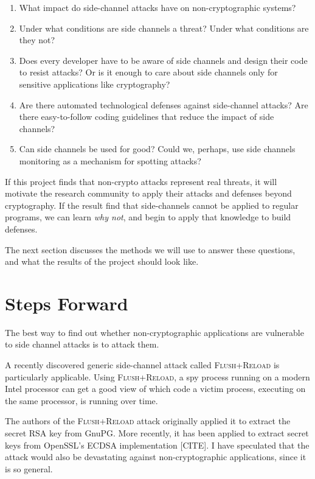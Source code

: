 \documentclass{acm_proc_article-sp}
\begin{document}
\begin{enumerate}
\item What impact do side-channel attacks have on non-cryptographic systems?

\item Under what conditions are side channels a threat? Under what conditions
      are they not?

\item Does every developer have to be aware of side channels and design their
      code to resist attacks? Or is it enough to care about side channels only
      for sensitive applications like cryptography?

\item Are there automated technological defenses against side-channel attacks?
      Are there easy-to-follow coding guidelines that reduce the impact of side
      channels?

\item Can side channels be used for good? Could we, perhaps, use side channels
      monitoring as a mechanism for spotting attacks?
\end{enumerate}

If this project finds that non-crypto attacks represent real threats, it will
motivate the research community to apply their attacks and defenses beyond
cryptography. If the result find that side-channels cannot be applied to regular
programs, we can learn \emph{why not}, and begin to apply that knowledge to
build defenses.

The next section discusses the methods we will use to answer these questions,
and what the results of the project should look like.

\section{Steps Forward}

The best way to find out whether non-cryptographic applications are vulnerable
to side channel attacks is to attack them.

A recently discovered generic side-channel attack called \textsc{Flush+Reload}
\cite{yarom2013flush} is particularly applicable. Using \textsc{Flush+Reload},
a spy process running on a modern Intel processor can get a good view of which
code a victim process, executing on the same processor, is running over time.

The authors of the \textsc{Flush+Reload} attack originally applied it to extract
the secret RSA key from GnuPG. More recently, it has been applied to extract
secret keys from OpenSSL's ECDSA implementation [CITE]. I have speculated
\cite{hornby2013flush} that the attack would also be devastating against
non-cryptographic applications, since it is so general.
\end{document}
